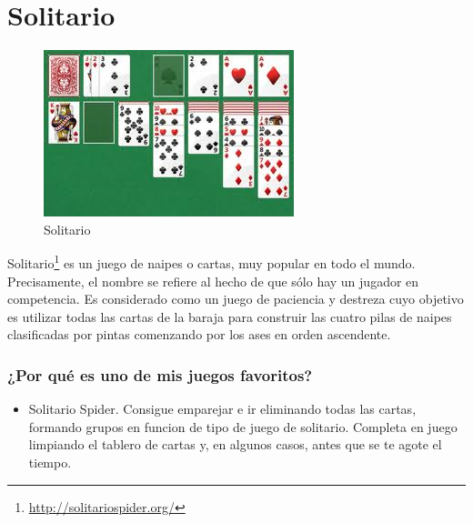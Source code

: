 \section{Solitario}

\begin{figure}[htbp]
\begin{center}
\includegraphics[width=.60\textwidth]{./imagenes/solitario.png}
\caption{Solitario}
\label{Solitario}
\end{center}
\end{figure}
Solitario\footnote{\url{http://solitariospider.org/}} es un juego de naipes o cartas, muy popular en todo el mundo. Precisamente, el nombre se refiere al hecho de que sólo hay un jugador en competencia. Es considerado como un juego de paciencia y destreza cuyo objetivo es utilizar todas las cartas de la baraja para construir las cuatro pilas de naipes clasificadas por pintas comenzando por los ases en orden ascendente.


\subsubsection{¿Por qué es uno de mis juegos favoritos?}
\begin{itemize}
\item Solitario Spider. Consigue emparejar e ir eliminando todas las cartas, formando grupos en funcion de tipo de juego de solitario. Completa en juego limpiando el tablero de cartas y, en algunos casos, antes que se te agote el tiempo.
 
\end{itemize}
